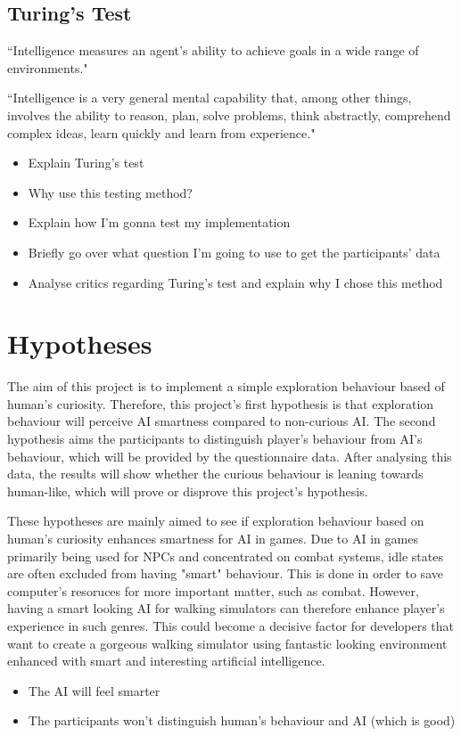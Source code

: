 \documentclass[journal]{IEEEtran}
\begin{document}
\subsection{Turing's Test}
``Intelligence measures an agent’s ability to achieve goals in a wide range of
environments." \cite{legg2007universal}

``Intelligence is a very general mental capability that, among other things, involves
the ability to reason, plan, solve problems, think abstractly, comprehend complex
ideas, learn quickly and learn from experience." \cite{gottfredson1997mainstream}
\begin{itemize}
	\item Explain Turing's test
	\item Why use this testing method?
	\item Explain how I'm gonna test my implementation
	\item Briefly go over what question I'm going to use to get the participants' data
	\item Analyse critics regarding Turing's test and explain why I chose this method
\end{itemize}

\section{Hypotheses}
The aim of this project is to implement a simple exploration behaviour based of human's curiosity. Therefore, this project's first hypothesis is that exploration behaviour will perceive AI smartness compared to non-curious AI. The second hypothesis aims the participants to distinguish player's behaviour from AI's behaviour, which will be provided by the questionnaire data. After analysing this data, the results will show whether the curious behaviour is leaning towards human-like, which will prove or disprove this project's hypothesis.

These hypotheses are mainly aimed to see if exploration behaviour based on human's curiosity enhances smartness for AI in games. Due to AI in games primarily being used for NPCs and concentrated on combat systems, idle states are often excluded from having "smart" behaviour. This is done in order to save computer's resoruces for more important matter, such as combat. However, having a smart looking AI for walking simulators can therefore enhance player's experience in such genres. This could become a decisive factor for developers that want to create a gorgeous walking simulator using fantastic looking environment enhanced with smart and interesting artificial intelligence.
\begin{itemize}
	\item The AI will feel smarter
	\item The participants won't distinguish human's behaviour and AI (which is good)
\end{itemize}
\end{document}
